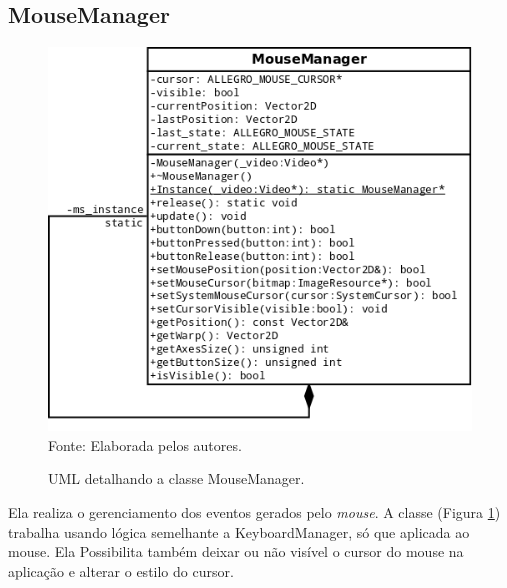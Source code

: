 \subsection{MouseManager}
%
%
\begin{figure}[H]
    \centering
    \caption{UML detalhando a classe MouseManager.}
    \label{MouseManager}
    \includegraphics[scale = 0.50]{uml/MouseManager.png}
    \\Fonte: Elaborada pelos autores.
\end{figure}
%
%
Ela realiza o gerenciamento dos eventos gerados pelo \textit{mouse}. A classe (Figura \ref{MouseManager}) trabalha usando lógica semelhante a KeyboardManager, só que aplicada ao mouse. Ela Possibilita também deixar ou não visível o cursor do mouse na aplicação e alterar o estilo do cursor.
%
%
